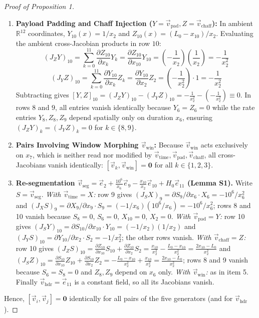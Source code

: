 \begin{proof}[Proof of Proposition 1]
\begin{enumerate}
    \item \textbf{Payload Padding and Chaff Injection ($Y = \vec{v}_{\text{pad}}, Z = \vec{v}_{\text{chaff}}$):} In ambient $\mathbb{R}^{12}$ coordinates, $Y_{10}(x) = 1/x_2$ and $Z_{10}(x) = (L_0 - x_{10})/x_2$. Evaluating the ambient cross-Jacobian products in row $10$:
    \begin{equation}
        (J_Z Y)_{10} = \sum_{k=0}^{11} \frac{\partial Z_{10}}{\partial x_k} Y_k = \frac{\partial Z_{10}}{\partial x_{10}} Y_{10} = \left(-\frac{1}{x_2}\right) \left(\frac{1}{x_2}\right) = -\frac{1}{x_2^2}
    \end{equation}
    \begin{equation}
        (J_Y Z)_{10} = \sum_{k=0}^{11} \frac{\partial Y_{10}}{\partial x_k} Z_k = \frac{\partial Y_{10}}{\partial x_2} Z_2 = \left(-\frac{1}{x_2^2}\right) \cdot 1 = -\frac{1}{x_2^2}
    \end{equation}
    Subtracting gives $[Y, Z]_{10} = (J_Z Y)_{10} - (J_Y Z)_{10} = -\frac{1}{x_2^2} - \left(-\frac{1}{x_2^2}\right) \equiv 0$. In rows $8$ and $9$, all entries vanish identically because $Y_6 = Z_6 = 0$ while the rate entries $Y_8, Z_8, Z_9$ depend spatially only on duration $x_6$, ensuring $(J_Z Y)_k = (J_Y Z)_k = 0$ for $k \in \{8, 9\}$.
    \item \textbf{Pairs Involving Window Morphing $\vec{v}_{\text{win}}$:} Because $\vec{v}_{\text{win}}$ acts exclusively on $x_7$, which is neither read nor modified by $\vec{v}_{\text{time}}, \vec{v}_{\text{pad}}, \vec{v}_{\text{chaff}}$, all cross-Jacobians vanish identically: $[ \vec{v}_k, \vec{v}_{\text{win}} ] = \mathbf{0}$ for all $k \in \{1, 2, 3\}$.
    \item \textbf{Re-segmentation $\vec{v}_{\text{seg}}=\vec e_2+\tfrac{10^6}{x_6}\vec e_9-\tfrac{x_{10}}{x_2}\vec e_{10}+H_0\vec e_{11}$ (Lemma S1).} Write $S=\vec v_{\text{seg}}$. \emph{With $\vec v_{\text{time}}=X$:} row 9 gives $(J_SX)_9=\partial S_9/\partial x_6\cdot X_6=-10^6/x_6^2$ and $(J_XS)_9=\partial X_9/\partial x_9\cdot S_9=(-1/x_6)(10^6/x_6)=-10^6/x_6^2$; rows 8 and 10 vanish because $S_8=0$, $S_6=0$, $X_{10}=0$, $X_2=0$. \emph{With $\vec v_{\text{pad}}=Y$:} row 10 gives $(J_SY)_{10}=\partial S_{10}/\partial x_{10}\cdot Y_{10}=(-1/x_2)(1/x_2)$ and $(J_YS)_{10}=\partial Y_{10}/\partial x_2\cdot S_2=-1/x_2^2$; the other rows vanish. \emph{With $\vec v_{\text{chaff}}=Z$:} row 10 gives $(J_ZS)_{10}=\tfrac{\partial Z_{10}}{\partial x_{10}}S_{10}+\tfrac{\partial Z_{10}}{\partial x_2}S_2=\tfrac{x_{10}}{x_2^2}-\tfrac{L_0-x_{10}}{x_2^2}=\tfrac{2x_{10}-L_0}{x_2^2}$ and $(J_SZ)_{10}=\tfrac{\partial S_{10}}{\partial x_{10}}Z_{10}+\tfrac{\partial S_{10}}{\partial x_2}Z_2=-\tfrac{L_0-x_{10}}{x_2^2}+\tfrac{x_{10}}{x_2^2}=\tfrac{2x_{10}-L_0}{x_2^2}$; rows 8 and 9 vanish because $S_6=S_8=0$ and $Z_8,Z_9$ depend on $x_6$ only. \emph{With $\vec v_{\text{win}}$:} as in item 5. Finally $\vec v_{\text{hdr}}=\vec e_{11}$ is a constant field, so all its Jacobians vanish.
\end{enumerate}
Hence, $[ \vec{v}_i, \vec{v}_j ] = \mathbf{0}$ identically for all pairs of the five generators (and for $\vec v_{\text{hdr}}$).
\end{proof}


